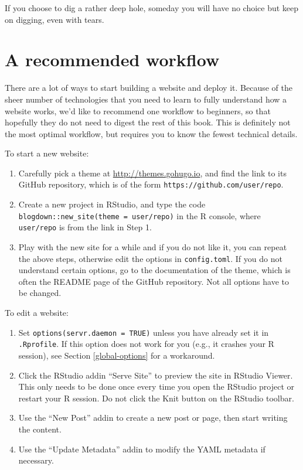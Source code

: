 \documentclass[12pt,]{krantz}
\renewenvironment{quote}{\begin{VF}}{\end{VF}}
\theoremstyle{definition}
\theoremstyle{definition}
\theoremstyle{definition}
\theoremstyle{remark}
\begin{document}
\begin{quote}
If you choose to dig a rather deep hole, someday you will have no choice
but keep on digging, even with tears.

\end{quote}

\hypertarget{workflow}{%
\section{A recommended workflow}\label{workflow}}

There are a lot of ways to start building a website and deploy it.
Because of the sheer number of technologies that you need to learn to
fully understand how a website works, we'd like to recommend one
workflow to beginners, so that hopefully they do not need to digest the
rest of this book. This is definitely not the most optimal workflow, but
requires you to know the fewest technical details.

To start a new website:

\begin{enumerate}
\def\labelenumi{\arabic{enumi}.}
\item
  Carefully pick a theme at \url{http://themes.gohugo.io}, and find the
  link to its GitHub repository, which is of the form
  \texttt{https://github.com/user/repo}.
\item
  Create a new project in RStudio, and type the code
  \texttt{blogdown::new\_site(theme\ =\ \textquotesingle{}user/repo\textquotesingle{})}
  in the R console, where \texttt{user/repo} is from the link in Step 1.
\item
  Play with the new site for a while and if you do not like it, you can
  repeat the above steps, otherwise edit the options in
  \texttt{config.toml}. If you do not understand certain options, go to
  the documentation of the theme, which is often the README page of the
  GitHub repository. Not all options have to be changed.
\end{enumerate}

To edit a website:

\begin{enumerate}
\def\labelenumi{\arabic{enumi}.}
\item
  Set \texttt{options(servr.daemon\ =\ TRUE)} unless you have already
  set it in \texttt{.Rprofile}. If this option does not work for you
  (e.g., it crashes your R session), see Section \ref{global-options}
  for a workaround.
\item
  Click the RStudio addin ``Serve Site'' to preview the site in RStudio
  Viewer. This only needs to be done once every time you open the
  RStudio project or restart your R session. Do not click the Knit
  button on the RStudio toolbar.
\item
  Use the ``New Post'' addin to create a new post or page, then start
  writing the content.
\item
  Use the ``Update Metadata'' addin to modify the YAML metadata if
  necessary.
\end{enumerate}
\end{document}
